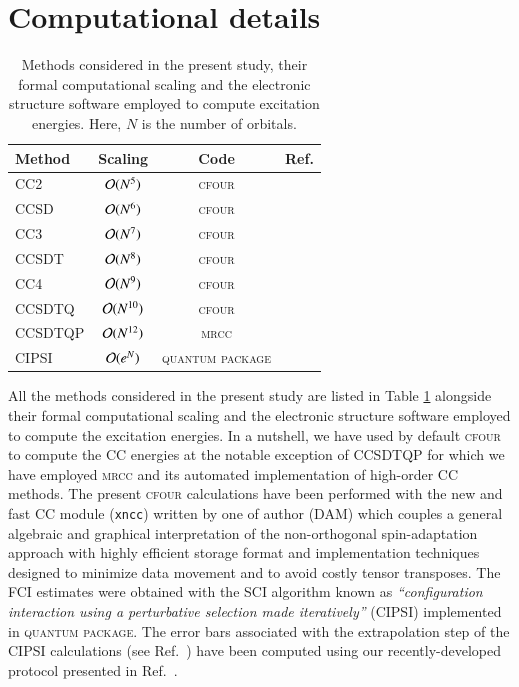 \documentclass[aip,jcp,reprint,noshowkeys,superscriptaddress]{revtex4-1}
\newcommand{\QP}{\textsc{quantum package}}
\newcommand{\MRCC}{\textsc{mrcc}}
\newcommand{\CFOUR}{\textsc{cfour}}
\begin{document}
\section{Computational details}

\begin{table}
	\caption{Methods considered in the present study, their formal computational scaling and the electronic structure software employed to compute excitation energies.
	Here, $N$ is the number of orbitals.
	\label{tab:scaling}}
	\begin{ruledtabular}
	\begin{tabular}{lccc}
		Method	&	Scaling					&	Code		&	Ref.					\\
		\hline
		CC2			&	$\order*{N^{5}}$	&	\CFOUR		&	\onlinecite{cfour}		\\
		CCSD		&	$\order*{N^{6}}$	&	\CFOUR		&	\onlinecite{cfour}		\\
		CC3			&	$\order*{N^{7}}$	&	\CFOUR		&	\onlinecite{cfour}		\\
		CCSDT		&	$\order*{N^{8}}$	&	\CFOUR		&	\onlinecite{cfour}		\\
		CC4			&	$\order*{N^{9}}$	&	\CFOUR		&	\onlinecite{cfour}		\\
		CCSDTQ		&	$\order*{N^{10}}$	&	\CFOUR		&	\onlinecite{cfour}		\\
		CCSDTQP		&	$\order*{N^{12}}$	&	\MRCC		&	\onlinecite{mrcc}		\\	
		CIPSI		&	$\order*{e^{N}}$	&	\QP			&	\onlinecite{qp2}		\\
	\end{tabular}
	\end{ruledtabular}
\end{table}

All the methods considered in the present study are listed in Table \ref{tab:scaling} alongside their formal computational scaling and the electronic structure software employed to compute the excitation energies.
In a nutshell, we have used by default {\CFOUR} \cite{cfour} to compute the CC energies at the notable exception of CCSDTQP for which we have employed {\MRCC} and its automated implementation of high-order CC methods. \cite{mrcc}
The present {\CFOUR} calculations have been performed with the new and fast CC module (\texttt{xncc})  written by one of author (DAM) which couples a general algebraic
and graphical interpretation of the non-orthogonal spin-adaptation approach with highly efficient storage format and implementation techniques designed to minimize data movement and to avoid costly tensor transposes. \cite{Matthews_2015b}
The FCI estimates were obtained with the SCI algorithm known as \textit{``configuration interaction using a perturbative selection made iteratively''} (CIPSI) implemented in {\QP}. \cite{qp2}
The error bars associated with the extrapolation step of the CIPSI calculations (see Ref.~) have been computed using our recently-developed protocol presented in Ref.~.
\end{document}
